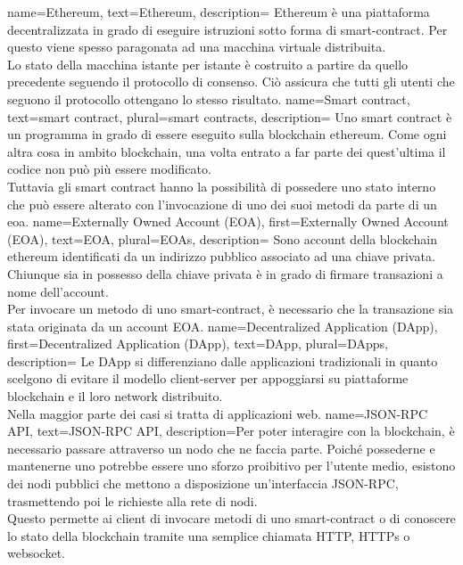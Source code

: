 {
    name={Ethereum},
    text={Ethereum},
    description={
            Ethereum è una piattaforma decentralizzata in grado di eseguire istruzioni sotto forma
            di \gls{smart-contract}.
            Per questo viene spesso paragonata ad una macchina virtuale distribuita. \\
            Lo stato della macchina istante per istante è costruito a partire da quello
            precedente seguendo il protocollo di consenso.
            Ciò assicura che tutti gli utenti che seguono il protocollo ottengano lo stesso
            risultato.
        }
}
{
    name={Smart contract},
    text={smart contract},
    plural={smart contracts},
    description={
            Uno smart contract è un programma in grado di essere eseguito sulla blockchain \gls{ethereum}.
            Come ogni altra cosa in ambito blockchain, una volta entrato a far parte dei quest'ultima
            il codice non può più essere modificato. \\
            Tuttavia gli smart contract hanno la possibilità di possedere uno stato interno che può essere
            alterato con l'invocazione di uno dei suoi metodi da parte di un \gls{eoa}.
        }
}
{
    name={Externally Owned Account (EOA)},
    first={Externally Owned Account (EOA)},
    text={EOA},
    plural={EOAs},
    description={
            Sono account della blockchain \gls{ethereum} identificati da un indirizzo pubblico associato ad una chiave privata.
            Chiunque sia in possesso della chiave privata è in grado di firmare transazioni a nome dell'account. \\
            Per invocare un metodo di uno \gls{smart-contract}, è necessario che la transazione sia stata originata da un account EOA.
        }
}
{
    name={Decentralized Application (DApp)},
    first={Decentralized Application (DApp)},
    text={DApp},
    plural={DApps},
    description={
            Le DApp si differenziano dalle applicazioni tradizionali in quanto scelgono di evitare il modello client-server
            per appoggiarsi su piattaforme blockchain e il loro network distribuito. \\
            Nella maggior parte dei casi si tratta di applicazioni web.
        }
}
{
    name={JSON-RPC API},
    text={JSON-RPC API},
    description={Per poter interagire con la blockchain, è necessario passare attraverso un nodo che ne faccia parte.
            Poiché possederne e mantenerne uno potrebbe essere uno sforzo proibitivo per l'utente medio, esistono dei nodi pubblici
            che mettono a disposizione un'interfaccia JSON-RPC, trasmettendo poi le richieste alla rete di nodi. \\
            Questo permette ai client di invocare metodi di uno \gls{smart-contract} o di conoscere lo stato della blockchain tramite una semplice chiamata HTTP, HTTPs o websocket.
        }
}

